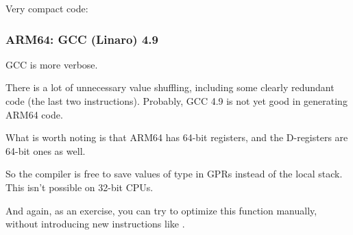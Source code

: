 Very compact code:



\subsubsection{ARM64: \NonOptimizing GCC (Linaro) 4.9}



\NonOptimizing GCC is more verbose.

There is a lot of unnecessary value shuffling, including some clearly redundant code 
(the last two  instructions).  Probably, GCC 4.9 is not yet good in generating ARM64 code.

What is worth noting is that ARM64 has 64-bit registers, and the D-registers are 64-bit ones as well.

So the compiler is free to save values of type \Tdouble in \ac{GPR}s instead of the local stack.
This isn't possible on 32-bit CPUs.

And again, as an exercise, you can try to optimize this function manually, without introducing
new instructions like .
